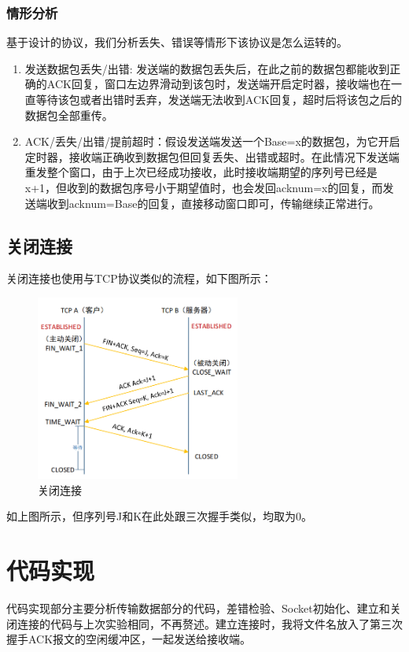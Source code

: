 \documentclass[UTF8,a4paper,10pt]{ctexart}
\begin{document}
\subsubsection{情形分析}
基于设计的协议，我们分析丢失、错误等情形下该协议是怎么运转的。
\begin{enumerate}
    \item 发送数据包丢失/出错: 发送端的数据包丢失后，在此之前的数据包都能收到正确的ACK回复，窗口左边界滑动到该包时，发送端开启定时器，接收端也在一直等待该包或者出错时丢弃，发送端无法收到ACK回复，超时后将该包之后的数据包全部重传。
    \item ACK/丢失/出错/提前超时：假设发送端发送一个Base=x的数据包，为它开启定时器，接收端正确收到数据包但回复丢失、出错或超时。在此情况下发送端重发整个窗口，由于上次已经成功接收，此时接收端期望的序列号已经是x+1，但收到的数据包序号小于期望值时，也会发回acknum=x的回复，而发送端收到acknum=Base的回复，直接移动窗口即可，传输继续正常进行。
\end{enumerate}

\subsection{关闭连接}
关闭连接也使用与TCP协议类似的流程，如下图所示：
\begin{figure}[H]
    \centering
\includegraphics[width=0.6\textwidth]{img/关闭连接.png}
    \caption{关闭连接}
\end{figure}
如上图所示，但序列号J和K在此处跟三次握手类似，均取为0。

\section{代码实现}
代码实现部分主要分析传输数据部分的代码，差错检验、Socket初始化、建立和关闭连接的代码与上次实验相同，不再赘述。建立连接时，我将文件名放入了第三次握手ACK报文的空闲缓冲区，一起发送给接收端。
\end{document}
